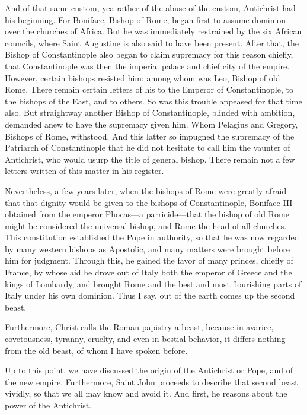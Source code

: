 And of that same custom, yea rather of the abuse of the custom, Antichrist had his beginning. For Boniface, Bishop of Rome, began first to assume dominion over the churches of Africa. But he was immediately restrained by the six African councils, where Saint Augustine is also said to have been present. After that, the Bishop of Constantinople also began to claim supremacy for this reason chiefly, that Constantinople was then the imperial palace and chief city of the empire. However, certain bishops resisted him; among whom was Leo, Bishop of old Rome. There remain certain letters of his to the Emperor of Constantinople, to the bishops of the East, and to others. So was this trouble appeased for that time also. But straightway another Bishop of Constantinople, blinded with ambition, demanded anew to have the supremacy given him. Whom Pelagius and Gregory, Bishops of Rome, withstood. And this latter so impugned the supremacy of the Patriarch of Constantinople that he did not hesitate to call him the vaunter of Antichrist, who would usurp the title of general bishop. There remain not a few letters written of this matter in his register.

Nevertheless, a few years later, when the bishops of Rome were greatly afraid that that dignity would be given to the bishops of Constantinople, Boniface III obtained from the emperor Phocas—a parricide—that the bishop of old Rome might be considered the universal bishop, and Rome the head of all churches. This constitution established the Pope in authority, so that he was now regarded by many western bishops as Apostolic, and many matters were brought before him for judgment. Through this, he gained the favor of many princes, chiefly of France, by whose aid he drove out of Italy both the emperor of Greece and the kings of Lombardy, and brought Rome and the best and most flourishing parts of Italy under his own dominion. Thus I say, out of the earth comes up the second beast.

Furthermore, Christ calls the Roman papistry a beast, because in avarice, covetousness, tyranny, cruelty, and even in bestial behavior, it differs nothing from the old beast, of whom I have spoken before.

Up to this point, we have discussed the origin of the Antichrist or Pope, and of the new empire. Furthermore, Saint John proceeds to describe that second beast vividly, so that we all may know and avoid it. And first, he reasons about the power of the Antichrist.

